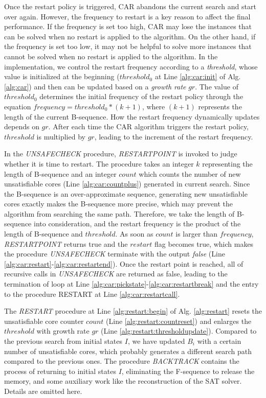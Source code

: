 Once the restart policy is triggered, CAR abandons the current search and start over again. However, the frequency to restart is a key reason to affect the final performance. If the frequency is set too high, CAR may lose the instances that can be solved when no restart is applied to the algorithm. On the other hand, if the frequency is set too low, it may not be helpful to solve more instances that cannot be solved when no restart is applied to the algorithm. In the implementation, we control the restart frequency according to a \emph{threshold}, whose value is initialized at the beginning ($threshold_0$ at Line \ref{alg:car:init} of Alg. \ref{alg:car}) and then can be updated based on a \emph{growth rate} $gr$. The value of $threshold_0$ determines the initial frequency of the restart policy through the equation $frequency = threshold_0 * (k+1)$, where $(k+1)$ represents the length of the current B-sequence. How the restart frequency dynamically updates depends on $gr$. After each time the CAR algorithm triggers the restart policy, $threshold$ is multiplied by $gr$, leading to the increment of the restart frequency. 

In the \emph{UNSAFECHECK} procedure,  \emph{RESTARTPOINT} is invoked to judge whether it is time to restart. The procedure takes an integer $k$ representing the length of B-sequence and an integer $count$ which counts the number of new unsatisfiable cores (Line \ref{alg:car:countplus}) generated in current search. Since the B-sequence is an over-approximate sequence, generating new unsatisfiable cores exactly makes the B-sequence more precise, which may prevent the algorithm from searching the same path. Therefore, we take the length of B-sequence into consideration, and the restart frequency is the product of the length of B-sequence and $threshold$. As soon as  $count$ is larger than $frequency$, \emph{RESTARTPOINT} returns true and the $restart$ flag becomes true, which makes the procedure \emph{UNSAFECHECK} terminate with the output \emph{false} (Line \ref{alg:car:restart}-\ref{alg:car:restartend}). Once the restart point is reached, all of recursive calls in \emph{UNSAFECHECK} are returned as false, leading to the termination of loop at Line \ref{alg:car:pickstate}-\ref{alg:car:restartbreak} and the entry to the procedure RESTART at Line \ref{alg:car:restartcall}.

The \emph{RESTART} procedure at Line \ref{alg:restart:begin} of Alg. \ref{alg:restart} resets the unsatisfiable core counter $count$ (Line \ref{alg:restart:countreset}) and enlarges the $threshold$ with growth rate $gr$ (Line \ref{alg:restart:thresholdupdate}). Compared to the previous search from initial states $I$, we have updated $B_{i}$ with a certain number of unsatisfiable cores, which probably generates a different search path compared to the previous ones.
The procedure \emph{BACKTRACK} contains the process of returning to initial states $I$, eliminating the F-sequence to release the memory, and some auxiliary work like the reconstruction of the SAT solver. Details are omitted here.

